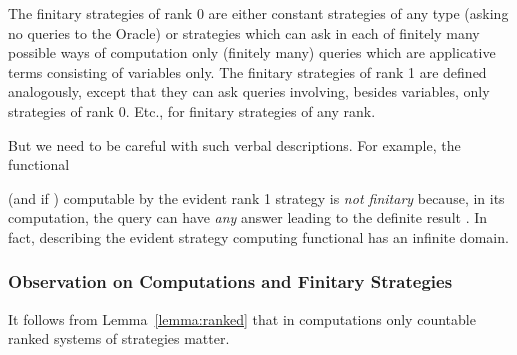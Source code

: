 \documentclass[fleqn]{LMCS}
\theoremstyle{plain}\newtheorem{satz}[thm]{Satz}
\theoremstyle{plain}\newtheorem{hyp}[thm]{Hypothesis}
\theoremstyle{plain}\newtheorem{hyps}[thm]{Hypotheses}
\theoremstyle{definition}\newtheorem{note}[thm]{Note}
\newcommand{\?}{\mbox{?}}
\begin{document}
\noindent
The finitary strategies of rank 0 are either constant strategies of any type 
(asking no queries to the Oracle) or strategies which can ask 
in each of finitely many possible ways of computation 
only (finitely many) queries which are applicative terms 
consisting of variables only. 
The finitary strategies of rank 1 are defined analogously, except that they can ask 
queries involving, besides variables, only strategies of rank 0. 
Etc., for finitary strategies of any rank. 

\medskip

But we need to be careful with such verbal descriptions. 
For example, the functional
 
(and  if )
computable by the evident rank 1 strategy 
is 
\emph{not finitary} because, 
in its computation, the query  can have \emph{any} answer  
leading to the definite result . 
In fact,  describing the evident strategy computing functional  has an infinite 
domain. 






\subsubsection{Observation on Computations and Finitary Strategies}
\label{sec:observation}
It follows from Lemma~\ref{lemma:ranked} that 
in computations only countable ranked systems of strategies 
 matter. 
\end{document}
